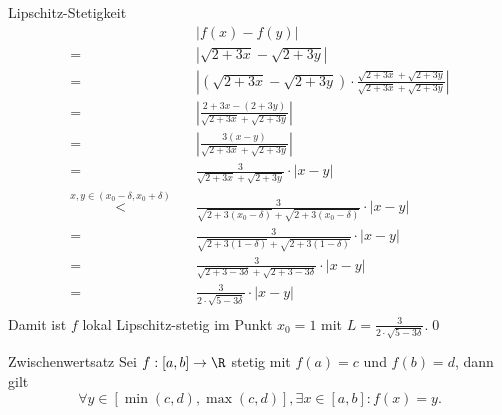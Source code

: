 \documentclass[german]{../spicker}
\renewcommand{\abs}[1]{\left| #1 \right|}
\begin{document}
\begin{example}{Lipschitz-Stetigkeit}
    $$
        \begin{aligned}
                                                             & \abs{f(x)-f(y)}                                                                                     \\
            = \quad                                          & \abs{\sqrt{2+3x} - \sqrt{2+3y}}                                                                     \\
            = \quad                                          & \abs{(\sqrt{2+3x} - \sqrt{2+3y}) \cdot \frac{\sqrt{2+3x} + \sqrt{2+3y}}{\sqrt{2+3x} + \sqrt{2+3y}}} \\
            = \quad                                          & \abs{\frac{2+3x-(2+3y)}{\sqrt{2+3x} + \sqrt{2+3y}}}                                                 \\
            = \quad                                          & \abs{\frac{3(x-y)}{\sqrt{2+3x} + \sqrt{2+3y}}}                                                      \\
            = \quad                                          & \frac{3}{\sqrt{2+3x} + \sqrt{2+3y}} \cdot \abs{x-y}                                                 \\
            \overset{x,y\in (x_0-\delta, x_0+\delta)}< \quad & \frac{3}{\sqrt{2+3(x_0-\delta)} + \sqrt{2+3(x_0-\delta)}} \cdot \abs{x-y}                           \\
            = \quad                                          & \frac{3}{\sqrt{2+3(1-\delta)} + \sqrt{2+3(1-\delta)}} \cdot \abs{x-y}                               \\
            = \quad                                          & \frac{3}{\sqrt{2+3-3\delta} + \sqrt{2+3-3\delta}} \cdot \abs{x-y}                                   \\
            = \quad                                          & \frac{3}{2\cdot \sqrt{5-3\delta}} \cdot \abs{x-y}                                                   \\
        \end{aligned}
    $$
    Damit ist $f$ lokal Lipschitz-stetig im Punkt $x_0 = 1$ mit $L = \frac{3}{2\cdot \sqrt{5-3\delta}}$.\qed
\end{example}

\begin{defi}{Zwischenwertsatz}
    Sei $f : [a, b] \to \R$ stetig mit $f(a) = c$ und $f(b) = d$, dann gilt
    $$
        \forall y \in [\min(c, d) , \max(c, d)], \exists x \in [a, b] : f(x) = y.
    $$
\end{defi}
\end{document}
